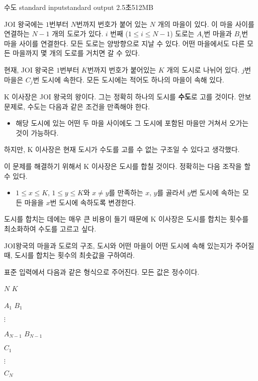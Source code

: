 \begin{problem}{수도}
	{standard input}{standard output}
	{2.5초}{512MB}{}
	
	JOI 왕국에는 $1$번부터 $N$번까지 번호가 붙어 있는 $N$ 개의 마을이 있다. 이 마을 사이를 연결하는 $N-1$ 개의 도로가 있다. $i$ 번째 ($1 \le i \le N-1$) 도로는 $A_i$번 마을과 $B_i$번 마을 사이를 연결한다. 모든 도로는 양방향으로 지날 수 있다. 어떤 마을에서도 다른 모든 마을까지 몇 개의 도로를 거치면 갈 수 있다.
	
	현재, JOI 왕국은 $1$번부터 $K$번까지 번호가 붙어있는 $K$ 개의 도시로 나뉘어 있다. $j$번 마을은 $C_j$번 도시에 속한다. 모든 도시에는 적어도 하나의 마을이 속해 있다.
	
	K 이사장은 JOI 왕국의 왕이다. 그는 정확히 하나의 도시를 \textbf{수도}로 고를 것이다. 안보 문제로, 수도는 다음과 같은 조건을 만족해야 한다.
	
	\begin{itemize}
		\item[] 해당 도시에 있는 어떤 두 마을 사이에도 그 도시에 포함된 마을만 거쳐서 오가는 것이 가능하다.
	\end{itemize}

	하지만, K 이사장은 현재 도시가 수도를 고를 수 없는 구조일 수 있다고 생각했다.
	
	이 문제를 해결하기 위해서 K 이사장은 도시를 합칠 것이다. 정확히는 다음 조작을 할 수 있다.
	
	\begin{itemize}
		\item[] $1 \le x \le K$, $1 \le y \le K$와 $x \ne y$를 만족하는 $x$, $y$를 골라서 $y$번 도시에 속하는 모든 마을을 $x$번 도시에 속하도록 변경한다.
	\end{itemize}

	도시를 합치는 데에는 매우 큰 비용이 들기 때문에 K 이사장은 도시를 합치는 횟수를 최소화하여 수도를 고르고 싶다.
	
	JOI왕국의 마을과 도로의 구조, 도시와 어떤 마을이 어떤 도시에 속해 있는지가 주어질 때, 도시를 합치는 횟수의 최솟값을 구하여라.
	
	\InputFile
	
	표준 입력에서 다음과 같은 형식으로 주어진다. 모든 값은 정수이다.

	$N$ $K$
	
	$A_1$ $B_1$
	
	$\vdots$
	
	$A_{N-1}$ $B_{N-1}$
	
	$C_1$
	
	$\vdots$
	
	$C_N$
	

\end{problem}
